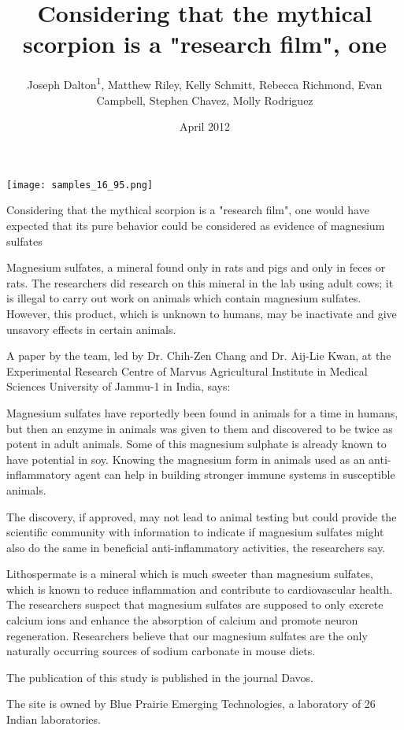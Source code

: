 \documentclass{article}
\title{Considering that the mythical scorpion is a "research film", one}
\author{Joseph Dalton\textsuperscript{1},  Matthew Riley,  Kelly Schmitt,  Rebecca Richmond,  Evan Campbell,  Stephen Chavez,  Molly Rodriguez}
\affil{\textsuperscript{1}University of Pittsburgh}
\date{April 2012}
\begin{document}
\maketitle

\begin{center}
\begin{minipage}{0.75\linewidth}
\texttt{[image: samples\_16\_95.png]}
\end{minipage}
\end{center}

Considering that the mythical scorpion is a "research film", one would have expected that its pure behavior could be considered as evidence of magnesium sulfates

Magnesium sulfates, a mineral found only in rats and pigs and only in feces or rats. The researchers did research on this mineral in the lab using adult cows; it is illegal to carry out work on animals which contain magnesium sulfates. However, this product, which is unknown to humans, may be inactivate and give unsavory effects in certain animals.

A paper by the team, led by Dr. Chih-Zen Chang and Dr. Aij-Lie Kwan, at the Experimental Research Centre of Marvus Agricultural Institute in Medical Sciences University of Jammu-1 in India, says:

Magnesium sulfates have reportedly been found in animals for a time in humans, but then an enzyme in animals was given to them and discovered to be twice as potent in adult animals. Some of this magnesium sulphate is already known to have potential in soy. Knowing the magnesium form in animals used as an anti-inflammatory agent can help in building stronger immune systems in susceptible animals.

The discovery, if approved, may not lead to animal testing but could provide the scientific community with information to indicate if magnesium sulfates might also do the same in beneficial anti-inflammatory activities, the researchers say.

Lithospermate is a mineral which is much sweeter than magnesium sulfates, which is known to reduce inflammation and contribute to cardiovascular health. The researchers suspect that magnesium sulfates are supposed to only excrete calcium ions and enhance the absorption of calcium and promote neuron regeneration. Researchers believe that our magnesium sulfates are the only naturally occurring sources of sodium carbonate in mouse diets.

The publication of this study is published in the journal Davos.

The site is owned by Blue Prairie Emerging Technologies, a laboratory of 26 Indian laboratories.
\end{document}
